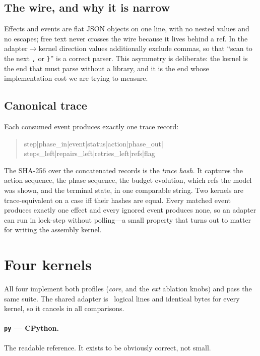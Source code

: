 \documentclass[11pt,a4paper]{article}
\begin{document}
\subsection{The wire, and why it is narrow}

Effects and events are flat JSON objects on one line, with no nested values and
no escapes; free text never crosses the wire because it lives behind a ref. In
the adapter$\rightarrow$kernel direction values additionally exclude commas, so
that ``scan to the next \texttt{,} or \texttt{\}}'' is a correct parser. This
asymmetry is deliberate: the kernel is the end that must parse without a
library, and it is the end whose implementation cost we are trying to measure.

\subsection{Canonical trace}

Each consumed event produces exactly one trace record:

\begin{quote}\footnotesize\ttfamily
step|phase\_in|event|status|action|phase\_out|\\
steps\_left|repairs\_left|retries\_left|refs|flag
\end{quote}

The SHA-256 over the concatenated records is the \emph{trace hash}. It captures
the action sequence, the phase sequence, the budget evolution, which refs the
model was shown, and the terminal state, in one comparable string. Two kernels
are trace-equivalent on a case iff their hashes are equal. Every matched event
produces exactly one effect and every ignored event produces none, so an
adapter can run in lock-step without polling---a small property that turns out
to matter for writing the assembly kernel.

\section{Four kernels}
\label{sec:kernels}

All four implement both profiles (\emph{core}, and the \emph{ext} ablation
knobs) and pass the same suite. The shared adapter is \adapterloc\ logical
lines and identical bytes for every kernel, so it cancels in all comparisons.

\paragraph{\texttt{py} --- CPython.} The readable reference. It exists to be
obviously correct, not small.
\end{document}
